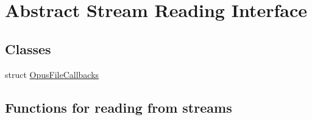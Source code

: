 \hypertarget{group__stream__callbacks}{}\section{Abstract Stream Reading Interface}
\label{group__stream__callbacks}
\subsection*{Classes}
\begin{DoxyCompactItemize}
\item 
struct \mbox{\hyperlink{struct_opus_file_callbacks}{Opus\+File\+Callbacks}}
\end{DoxyCompactItemize}
\subsection*{Functions for reading from streams}
\label{_amgrpd4385b08c3c11bcaad7ac9c007fab1ca}%
